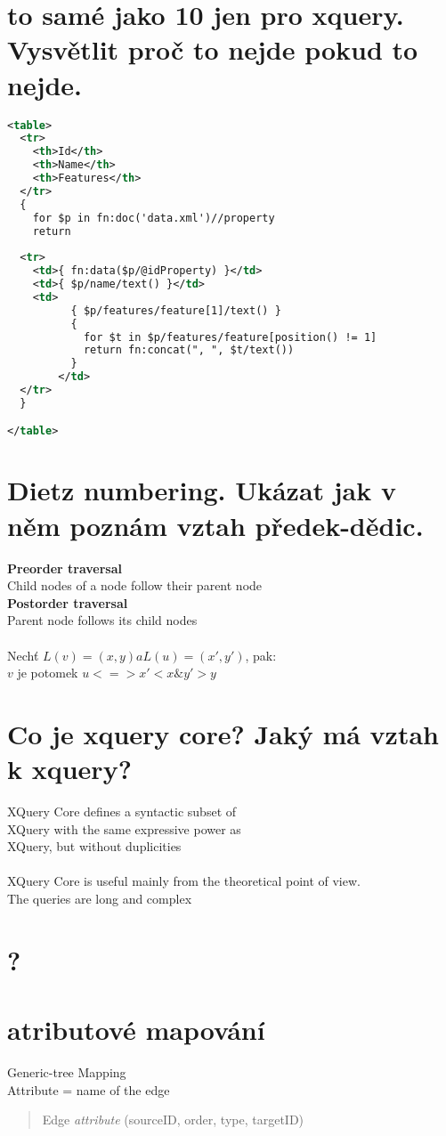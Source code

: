 \documentclass[a4paper,titlepage]{article}
\begin{document}
\section{to samé jako 10 jen pro xquery. Vysvětlit proč to nejde pokud to nejde.  }
		\begin{lstlisting}[language=XML]
<table>
  <tr>
    <th>Id</th>
    <th>Name</th>
    <th>Features</th>
  </tr>
  {
    for $p in fn:doc('data.xml')//property
    return
      
  <tr>
    <td>{ fn:data($p/@idProperty) }</td>
    <td>{ $p/name/text() }</td>
    <td>
          { $p/features/feature[1]/text() }
          {
            for $t in $p/features/feature[position() != 1]
            return fn:concat(", ", $t/text())
          }
        </td>
  </tr>
  }

</table>
	\end{lstlisting}

\section{Dietz numbering. Ukázat jak v něm poznám vztah předek-dědic.  }
	\textbf{Preorder traversal}\\
		Child nodes of a node follow their parent node\\
	\textbf{Postorder traversal}\\
		Parent node follows its child nodes\\
	\\
	 Nechť $L(v)=(x, y) a L(u)=(x', y')$, pak:\\
        $v$ je potomek $u <=> x' < x \& y' > y$

\section{Co je xquery core? Jaký má vztah k xquery?  }
	XQuery Core defines a syntactic subset of\\
	XQuery with the same expressive power as\\
	XQuery, but without duplicities\\\\
	XQuery Core is useful mainly from the theoretical point of view.\\
		The queries are long and complex


\section{?}
\section{atributové mapování }
	Generic-tree Mapping \\
		Attribute = name of the edge\\
		\begin{quote}
		Edge \textit{attribute} (sourceID, order, type, targetID)
		\end{quote}
	
\end{document}
